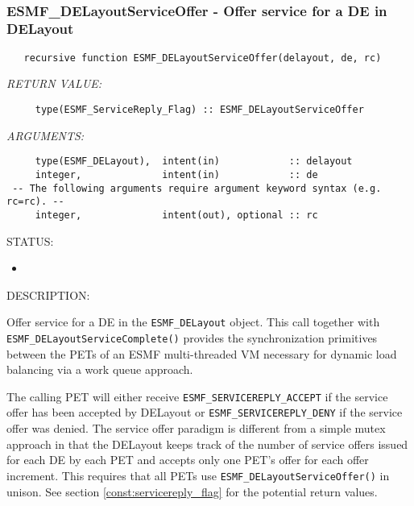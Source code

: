  
\mbox{}\hrulefill\ 
 
\subsubsection [ESMF\_DELayoutServiceOffer] {ESMF\_DELayoutServiceOffer - Offer service for a DE in DELayout}


 
\begin{verbatim}   recursive function ESMF_DELayoutServiceOffer(delayout, de, rc)
           \end{verbatim}{\em RETURN VALUE:}
\begin{verbatim}     type(ESMF_ServiceReply_Flag) :: ESMF_DELayoutServiceOffer\end{verbatim}{\em ARGUMENTS:}
\begin{verbatim}     type(ESMF_DELayout),  intent(in)            :: delayout
     integer,              intent(in)            :: de
 -- The following arguments require argument keyword syntax (e.g. rc=rc). --
     integer,              intent(out), optional :: rc\end{verbatim}
{\sf STATUS:}
   \begin{itemize}
   \item{}
   \end{itemize}
  
{\sf DESCRIPTION:\\ }


       \begin{sloppypar}
       Offer service for a DE in the {\tt ESMF\_DELayout} object. This call
       together with {\tt ESMF\_DELayoutServiceComplete()} provides the
       synchronization primitives between the PETs of an ESMF multi-threaded VM
       necessary for dynamic load balancing via a work queue approach.
  
       The calling PET will either receive {\tt ESMF\_SERVICEREPLY\_ACCEPT} if
       the service offer has been accepted by DELayout or 
       {\tt ESMF\_SERVICEREPLY\_DENY} if the service offer was denied. The 
       service offer paradigm is different from a simple mutex approach in that
       the DELayout keeps track of the number of service offers issued for each
       DE by each PET and accepts only one PET's offer for each offer increment.
       This requires that all PETs use {\tt ESMF\_DELayoutServiceOffer()} in 
       unison. See section \ref{const:servicereply_flag} for the potential return
       values.
       \end{sloppypar}
  
